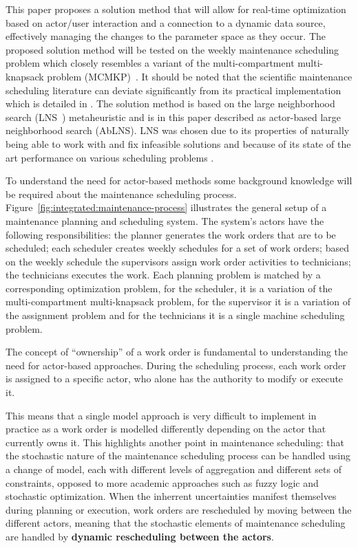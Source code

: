 This paper proposes a solution method that will allow for real-time
optimization based on actor/user interaction and a connection to a dynamic
data source, effectively managing the changes to the parameter space as
they occur. The proposed solution method will be tested on the weekly
maintenance scheduling problem \citep{palmerMaintenancePlanningScheduling2019weeklyscheduling}
which closely resembles a variant of the multi-compartment multi-knapsack
problem (MCMKP)~\citep{do2007constrained}. It should be noted that the
scientific maintenance scheduling literature can deviate significantly
from its practical implementation which is detailed in
\citep{palmerMaintenancePlanningScheduling2019}. The solution method is based
on the large neighborhood search (LNS~\citep{shaw1998using}) metaheuristic and
is in this paper described as actor-based large neighborhood search (AbLNS). LNS
was chosen due to its properties of naturally being able to work with and fix
infeasible solutions and because of its state of the art performance on various
scheduling problems \citep{gendreauHandbookMetaheuristics2019lnschapter}.

To understand the need for actor-based methods some
background knowledge will be required about the maintenance scheduling process.
Figure~\ref{fig:integrated:maintenance-process} illustrates the general setup
of a maintenance planning and scheduling system. The system's actors
have the following responsibilities: the planner generates the work orders that
are to be scheduled; each scheduler creates weekly schedules for a set of work orders; 
based on the weekly schedule the supervisors assign work order
activities to technicians; the
technicians executes the work. Each planning problem is matched 
by a corresponding optimization problem, for the scheduler, it is a variation of the
multi-compartment multi-knapsack problem, for the supervisor it is a variation of the 
assignment problem and for the technicians it is a single machine scheduling problem.

The concept of ``ownership'' of a work order is fundamental to understanding
the need for actor-based approaches. During the scheduling process, each work
order is assigned to a specific actor, who alone has the authority to modify or
execute it.

This means that a single model approach is very difficult to implement in practice
as a work order is modelled differently depending on the actor that currently
owns it. This highlights another point in maintenance scheduling: that
the stochastic nature of the maintenance scheduling process can be handled using
a change of model, each with different levels of aggregation and different sets
of constraints, opposed to more academic approaches such as fuzzy logic and
stochastic optimization. When the inherrent uncertainties manifest themselves
during planning or execution, work orders are rescheduled by moving between
the different actors, meaning that the stochastic elements of maintenance
scheduling are handled by \textbf{dynamic rescheduling between the actors}.

